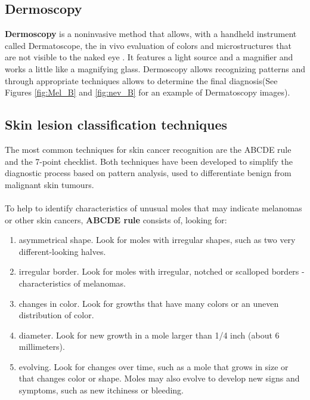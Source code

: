 \subsection{Dermoscopy}
\textbf{Dermoscopy} is a noninvasive method that allows,  with a handheld instrument called Dermatoscope, the in vivo evaluation of colors and microstructures that are not visible to the naked eye \cite{Dermoscopy}. It features a light source and a magnifier and works a little like a magnifying glass.
Dermoscopy allows recognizing patterns and through appropriate techniques allows to determine the final diagnosis(See Figures \ref{fig:Mel_B} and \ref{fig:nev_B} for an example of Dermatoscopy images).\\ 


\subsection{Skin lesion classification techniques}
The most common techniques for skin cancer recognition are the ABCDE rule and the 7-point checklist.
Both techniques have been developed to simplify the diagnostic process based on pattern analysis, used to differentiate benign from malignant skin tumours. \\ \\
To help to identify characteristics of unusual moles that may indicate melanomas or other skin cancers,  \textbf{ABCDE rule} consists of, looking for:
\begin{enumerate}[label=(\Alph*)]
\item asymmetrical shape. Look for moles with irregular shapes, such as two very different-looking halves.
\item irregular border. Look for moles with irregular, notched or scalloped borders - characteristics of melanomas.
\item changes in color. Look for growths that have many colors or an uneven distribution of color.
\item diameter. Look for new growth in a mole larger than 1/4 inch (about 6 millimeters).
\item evolving. Look for changes over time, such as a mole that grows in size or that changes color or shape. Moles may also evolve to develop new signs and symptoms, such as new itchiness or bleeding.
\end{enumerate}

